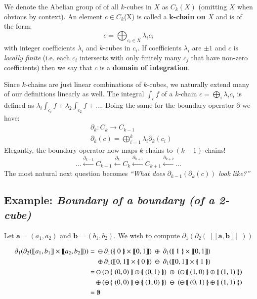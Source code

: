 \begin{definition}
We denote the Abelian group of of all $k$-cubes in $X$ as $C_k(X)$ (omitting $X$ when obvious by context).
An element $c \in C_k$(X) is called a \textbf{$\boldsymbol{k}$-chain on $X$} and is of the form:
\begin{equation}
	c = \bigoplus_{c_i \in X} \lambda_i c_i
\end{equation}
with integer coefficients $\lambda_i$ and  $k$-cubes in $c_i$.
If coefficients $\lambda_i$ are $\pm 1$ and $c$ is \emph{locally finite} (i.e. each $c_i$ intersects with only finitely many $c_j$ that have non-zero coefficients) then we say that $c$ is a \textbf{domain of integration}.
\end{definition}
	
Since $k$-chains are just linear combinations of $k$-cubes, we naturally extend many of our definitions linearly as well.
The integral $\int_c f$ of a $k$-chain $c=\bigoplus_i \lambda_i c_i$ is defined as $\lambda_i \int_{c_i} f  + \lambda_2 \int_{c_2} f + \ldots$.
Doing the same for the boundary operator $\partial$ we have:
\begin{align*}
	&\partial_k: C_k \to C_{k-1} \\
	&\partial_k(c) = \bigoplus_{i=1}^k \lambda_i \partial_k(c_i)
\end{align*}
Elegantly, the boundary operator now maps $k$-chains to $(k-1)$-chains!
\begin{equation}
	\ldots \xleftarrow{\partial_{k-1}} C_{k-1} \xleftarrow{\partial_{k}} C_k \xleftarrow{\partial_{k+1}} C_{k+1} \xleftarrow{\partial_{k+2}} ...
\end{equation}
The most natural next question becomes \emph{``What does $\partial_{k-1}( \partial_k ( c ))$ look like?''}


\subsection{Example: \emph{Boundary of a boundary (of a 2-cube)}}
Let $\boldsymbol{a} =(a_1,a_2)$ and $\boldsymbol{b}= (b_1,b_2)$.
We wish to compute $\partial_1 ( \partial_2 ( \; [\![\boldsymbol{a}, \boldsymbol{b} ]\!] \; ) )$

\begin{align}
	\partial_1 ( \partial_2 ( [\![ a_1 , b_1 ]\!] \times [\![a_2, b_2 ]\!] ) )
	=	& \; \ominus \partial_1( \hset{0} \times [\![0,1]\!]) \; \oplus 	\; \partial_1(\hset{1} \times [\![0,1]\!]) \notag \\
		& \; \oplus 	\partial_1( [\![0,1]\!] \times \hset{0}) \; \ominus \; \partial_1([\![0,1]\!] \times \hset{1}) \\
	=	& \ominus	( \ominus \hset{(0,0)} \oplus \hset{(0,1)} ) \; \oplus \; 	(\ominus \hset{(1,0)} \oplus \hset{(1,1)}) \notag \\
		& \oplus 	( \ominus \hset{(0,0)} \oplus \hset{(1,0)} ) \; \ominus \;	(\ominus \hset{(0,1)} \oplus \hset{(1,1)}) \\
	=	& \;\emptyset	
\end{align}


